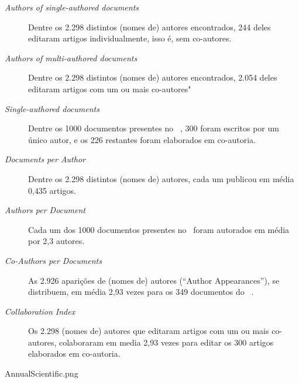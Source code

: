 \begin{description}
    \item [\textit{Authors of single-authored documents}] Dentre os 2.298 distintos (nomes de) autores encontrados, 244 deles editaram artigos individualmente, isso é, sem co-autores.
    \item [\textit{Authors of multi-authored documents}] Dentre os 2.298 distintos (nomes de) autores encontrados, 2.054 deles editaram artigos com um ou mais co-autores"
    \item [\textit{Single-authored documents}] Dentre os 1000 documentos presentes no \dataset\  , 300 foram escritos por um único autor, e os 226 restantes foram elaborados em co-autoria.
    \item [\textit{Documents per Author}] Dentre os 2.298 distintos (nomes de) autores, cada um publicou em média 0,435 artigos.
    \item [\textit{Authors per Document}] Cada um dos 1000 documentos presentes no \dataset\  foram autorados em média por  2,3 autores.
    \item [\textit{Co-Authors per Documents}] As 2.926 aparições de (nomes de) autores (``Author Appearances''), se distribuem, em média 2,93 vezes para os 349 documentos do \dataset\ .
    \item [\textit{Collaboration Index}] Os 2.298 (nomes de) autores que editaram artigos com um ou mais co-autores, colaboraram em media 2,93 vezes para editar os 300 artigos elaborados em co-autoria.
\end{description}



AnnualScientific.png